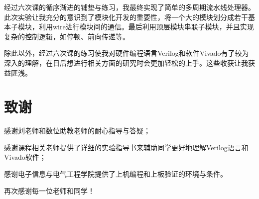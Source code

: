 经过六次课的循序渐进的铺垫与练习，我最终实现了简单的多周期流水线处理器。此次实验让我充分的意识到了模块化开发的重要性，将一个大的模块划分成若干基本子模块，利用wire进行模块间的通信。最后利用顶层模块串联子模块，并且实现复杂的控制逻辑，如停顿、前向传递等。

除此以外，经过六次课的练习使我对硬件编程语言Verilog和软件Vivado有了较为深入的理解，在日后想进行相关方面的研究时会更加轻松的上手。这些收获让我获益匪浅。

\section{致谢}
感谢刘老师和数位助教老师的耐心指导与答疑；

感谢课程相关老师提供了详细的实验指导书来辅助同学更好地理解Verilog语言和Vivado软件；

感谢电子信息与电气工程学院提供了上机编程和上板验证的环境与条件。

再次感谢每一位老师和同学！